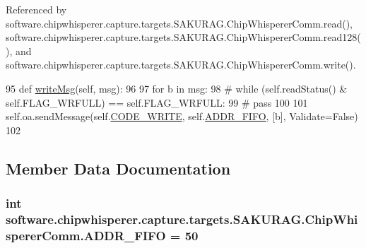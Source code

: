 Referenced by software.\+chipwhisperer.\+capture.\+targets.\+S\+A\+K\+U\+R\+A\+G.\+Chip\+Whisperer\+Comm.\+read(), software.\+chipwhisperer.\+capture.\+targets.\+S\+A\+K\+U\+R\+A\+G.\+Chip\+Whisperer\+Comm.\+read128(), and software.\+chipwhisperer.\+capture.\+targets.\+S\+A\+K\+U\+R\+A\+G.\+Chip\+Whisperer\+Comm.\+write().


\begin{DoxyCode}
95     \textcolor{keyword}{def }\hyperlink{classsoftware_1_1chipwhisperer_1_1capture_1_1targets_1_1SAKURAG_1_1ChipWhispererComm_ab1bfde1b19eefaefd3f18ee4178c982c}{writeMsg}(self, msg):
96 
97         \textcolor{keywordflow}{for} b \textcolor{keywordflow}{in} msg:
98             \textcolor{comment}{# while (self.readStatus() & self.FLAG\_WRFULL) == self.FLAG\_WRFULL:}
99             \textcolor{comment}{#    pass}
100 
101             self.oa.sendMessage(self.\hyperlink{classsoftware_1_1chipwhisperer_1_1capture_1_1targets_1_1SAKURAG_1_1ChipWhispererComm_a1e107c656728a8cc0f3ceaa461c9e852}{CODE\_WRITE}, self.\hyperlink{classsoftware_1_1chipwhisperer_1_1capture_1_1targets_1_1SAKURAG_1_1ChipWhispererComm_a2d8e1e80332b73a79cacc8d693c6fc9c}{ADDR\_FIFO}, [b], Validate=\textcolor{keyword}{False})
102 
\end{DoxyCode}


\subsection{Member Data Documentation}
\hypertarget{classsoftware_1_1chipwhisperer_1_1capture_1_1targets_1_1SAKURAG_1_1ChipWhispererComm_a2d8e1e80332b73a79cacc8d693c6fc9c}{}
\subsubsection[{A\+D\+D\+R\+\_\+\+F\+I\+F\+O}]{\setlength{\rightskip}{0pt plus 5cm}int software.\+chipwhisperer.\+capture.\+targets.\+S\+A\+K\+U\+R\+A\+G.\+Chip\+Whisperer\+Comm.\+A\+D\+D\+R\+\_\+\+F\+I\+F\+O = 50\hspace{0.3cm}{\ttfamily [static]}}\label{classsoftware_1_1chipwhisperer_1_1capture_1_1targets_1_1SAKURAG_1_1ChipWhispererComm_a2d8e1e80332b73a79cacc8d693c6fc9c}


